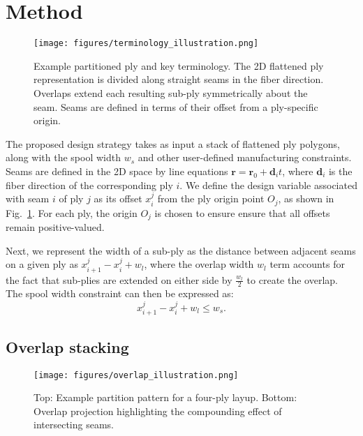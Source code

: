 \section{Method}
\label{sec:method}

\begin{figure}
    \centering
    \texttt{[image: figures/terminology\_illustration.png]}
    \caption{Example partitioned ply and key terminology. The 2D flattened ply representation is divided along straight seams in the fiber direction. Overlaps extend each resulting sub-ply symmetrically about the seam. Seams are defined in terms of their offset from a ply-specific origin.}
    \label{fig:terminology}
\end{figure}

The proposed design strategy takes as input a stack of flattened ply polygons, along with the spool width $w_s$ and other user-defined manufacturing constraints.
Seams are defined in the 2D space by line equations ${\mathbf{r} = \mathbf{r}_0 + \mathbf{d}_i t}$, where $\mathbf{d}_i$ is the fiber direction of the corresponding ply $i$. We define the design variable associated with seam $i$ of ply $j$ as its offset $x_i^j$ from the ply origin point $O_j$, as shown in Fig.~\ref{fig:terminology}. For each ply, the origin $O_j$ is chosen to ensure ensure that all offsets remain positive-valued.

Next, we represent the width of a sub-ply as the distance between adjacent seams on a given ply as ${x_{i+1}^j-x_{i}^j + w_l}$, where the overlap width $w_l$ term accounts for the fact that sub-plies are extended on either side by $\frac{w_l}{2}$ to create the overlap. The spool width constraint can then be expressed as:
\begin{equation}
    x_{i+1}^j-x_{i}^j+w_l \leq w_{s}.
    \label{eq:max_ply_width}
\end{equation}

\subsection{Overlap stacking}
\begin{figure}
    \centering
    \texttt{[image: figures/overlap\_illustration.png]}
    \caption{Top: Example partition pattern for a four-ply layup. Bottom: Overlap projection highlighting the compounding effect of intersecting seams.}
    \label{fig:overlap_illustration}
\end{figure}

